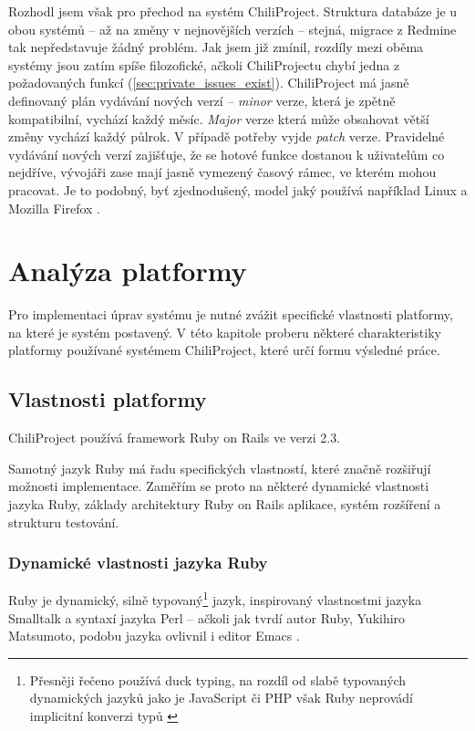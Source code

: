 \documentclass[thesis=B,czech]{FITthesis}[2012/05/02]
\begin{document}
Rozhodl jsem však pro přechod na systém ChiliProject. Struktura databáze
je u obou systémů -- až na změny v nejnovějších verzích -- stejná,
migrace z Redmine tak nepředstavuje žádný problém. Jak jsem již zmínil,
rozdíly mezi oběma systémy jsou zatím spíše filozofické, ačkoli
ChiliProjectu chybí jedna z požadovaných funkcí
(\ref{sec:private_issues_exist}). ChiliProject má jasně definovaný plán
vydávání nových verzí -- \emph{minor} verze, která je zpětně kompatibilní,
vychází každý měsíc. \emph{Major} verze která může obsahovat větší změny
vychází každý půlrok. V případě potřeby vyjde \emph{patch} verze.
Pravidelné vydávání nových verzí zajišťuje, že se hotové funkce dostanou
k uživatelům co nejdříve, vývojáři zase mají jasně vymezený časový
rámec, ve kterém mohou pracovat. Je to podobný, byť zjednodušený, model
jaký používá například Linux a Mozilla Firefox
\citep{MozillaDevProcess}.

\chapter{Analýza platformy}
\label{chap:analyza_navrh}

Pro implementaci úprav systému je nutné zvážit specifické vlastnosti
platformy, na které je systém postavený. V této kapitole proberu některé
charakteristiky platformy používané systémem ChiliProject, které určí
formu výsledné práce.

\section{Vlastnosti platformy}

ChiliProject používá framework Ruby on Rails ve verzi 2.3.

Samotný jazyk Ruby má řadu specifických vlastností, které značně
rozšiřují možnosti implementace. Zaměřím se proto na některé dynamické
vlastnosti jazyka Ruby, základy architektury Ruby on Rails aplikace,
systém rozšíření a strukturu testování.

\subsection{Dynamické vlastnosti jazyka Ruby}

Ruby je dynamický, silně typovaný\footnote{Přesněji řečeno používá
  \gls{duck typing}, na rozdíl od slabě typovaných dynamických jazyků
  jako je JavaScript či PHP však Ruby neprovádí implicitní konverzi typů
  \citep{Lamontagne2007}} jazyk, inspirovaný vlastnostmi jazyka
Smalltalk a syntaxí jazyka Perl \citep{Stewart2001} -- ačkoli jak tvrdí
autor Ruby, Yukihiro  Matsumoto, podobu jazyka ovlivnil i editor
Emacs \citep{Matsumoto2012}.
\end{document}
